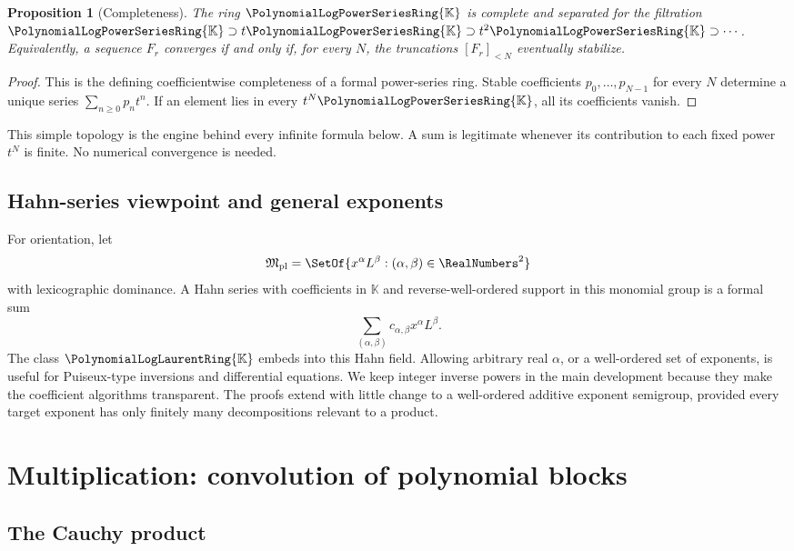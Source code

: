 \documentclass[11pt]{article}
\theoremstyle{pltheorem}
\newtheorem{proposition}[theorem]{Proposition}
\newcommand{\K}{\mathbb K}
\newcommand{\PL}{\PolynomialLogPowerSeriesRing{\K}}
\newcommand{\PLL}{\PolynomialLogLaurentRing{\K}}
\begin{document}
\begin{proposition}[Completeness]\label{prop:complete}
The ring \(\PL\) is complete and separated for the filtration
\(\PL\supset t\PL\supset t^2\PL\supset\cdots\).  Equivalently, a sequence \(F_r\) converges if and only if, for every \(N\), the truncations \([F_r]_{<N}\) eventually stabilize.
\end{proposition}

\begin{proof}
This is the defining coefficientwise completeness of a formal power-series ring.  Stable coefficients \(p_0,\ldots,p_{N-1}\) for every \(N\) determine a unique series \(\sum_{n\ge0}p_nt^n\).  If an element lies in every \(t^N\PL\), all its coefficients vanish.
\end{proof}

This simple topology is the engine behind every infinite formula below.  A sum is legitimate whenever its contribution to each fixed power \(t^N\) is finite.  No numerical convergence is needed.

\subsection{Hahn-series viewpoint and general exponents}

For orientation, let
\[
 \mathfrak M_{\mathrm{pl}}=\SetOf{x^\alpha L^\beta:(\alpha,\beta)\in\RealNumbers^2}
\]
with lexicographic dominance.  A Hahn series with coefficients in \(\K\) and reverse-well-ordered support in this monomial group is a formal sum
\[
 \sum_{(\alpha,\beta)}c_{\alpha,\beta}x^\alpha L^\beta.
\]
The class \(\PLL\) embeds into this Hahn field.  Allowing arbitrary real \(\alpha\), or a well-ordered set of exponents, is useful for Puiseux-type inversions and differential equations.  We keep integer inverse powers in the main development because they make the coefficient algorithms transparent.  The proofs extend with little change to a well-ordered additive exponent semigroup, provided every target exponent has only finitely many decompositions relevant to a product.

\section{Multiplication: convolution of polynomial blocks}
\label{sec:multiplication}

\subsection{The Cauchy product}
\end{document}
